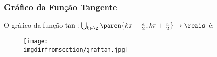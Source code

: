 \subsubsection{Gráfico da Função Tangente}

\begin{example}
O gráfico da função $\tan: \bigcup_{k \in \Z} \paren{k \pi - \frac
{\pi} 2, k \pi + \frac {\pi} 2} \to \reais$ é:
%
\begin{figure}[H]
\centering
\texttt{[image: \\imgdirfromsection/graftan.jpg]}
\end{figure}
\end{example}